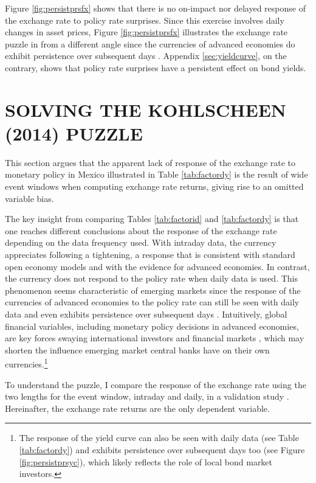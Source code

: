 Figure \ref{fig:persistprsfx} shows that there is no on-impact nor delayed response of the exchange rate to policy rate surprises. Since this exercise involves daily changes in asset prices, Figure \ref{fig:persistprsfx} illustrates the exchange rate puzzle in \textcite{Kohlscheen:2014} from a different angle since the currencies of advanced economies do exhibit persistence over subsequent days \parencite{Rosa:2011JBF, FerrariKearnsSchrimpf:2021}. Appendix \ref{sec:yieldcurve}, on the contrary, shows that policy rate surprises have a persistent effect on bond yields. 

\sectitlespace
\section{SOLVING THE KOHLSCHEEN (2014) PUZZLE} \label{sec:puzzle}
\sectitlespace

This section argues that the apparent lack of response of the exchange rate to monetary policy in Mexico illustrated in Table \ref{tab:factordy} is the result of wide event windows when computing exchange rate returns, giving rise to an omitted variable bias. 

The key insight from comparing Tables \ref{tab:factorid} and \ref{tab:factordy} is that one reaches different conclusions about the response of the exchange rate depending on the data frequency used. With intraday data, the currency appreciates following a tightening, a response that is consistent with standard open economy models and with the evidence for advanced economies. In contrast, the currency does not respond to the policy rate when daily data is used. This phenomenon seems characteristic of emerging markets \parencite{Kohlscheen:2014} since the response of the currencies of advanced economies to the policy rate can still be seen with daily data and even exhibits persistence over subsequent days \parencite{Rosa:2011JBF,Wright:2012, FerrariKearnsSchrimpf:2021}. Intuitively, global financial variables, including monetary policy decisions in advanced economies, are key forces swaying international investors and financial markets \parencite{Rey:2013}, which may shorten the influence emerging market central banks have on their own currencies.\footnote{The response of the yield curve can also be seen with daily data (see Table \ref{tab:factordy}) and exhibits persistence over subsequent days too (see Figure \ref{fig:persistprsyc}), which likely reflects the role of local bond market investors.} 

To understand the puzzle, I compare the response of the exchange rate using the two lengths for the event window, intraday and daily, in a validation study \parencite{Boundetal:1994}. Hereinafter, the exchange rate returns are the only dependent variable.

